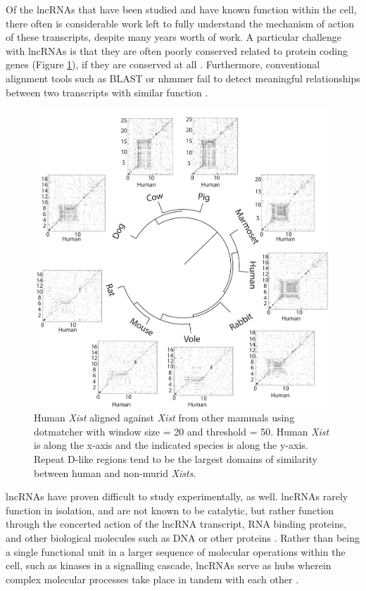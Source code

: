Of the lncRNAs that have been studied and have known function within the cell, there often is considerable work left to fully understand the mechanism of action of these transcripts, despite many years worth of work. A particular challenge with lncRNAs is that they are often poorly conserved related to protein coding genes (Figure \ref{fig:xistconserve}), if they are conserved at all \cite{Sleutels2002TheGenes,Pang2006RapidFunction, Johnsson2014EvolutionaryFunction}. Furthermore, conventional alignment tools such as BLAST or nhmmer fail to detect meaningful relationships between two transcripts with similar function \cite{Kirk2018FunctionalContent,Sprague2019NonlinearDomains}. 

 \begin{figure}[t!]
\centering
\includegraphics[width=.95\textwidth]{images/combined.pdf}
\caption[Much of \emph{Xist} is poorly conserved across species.]{Human \textit{Xist} aligned against \textit{Xist} from other mammals using dotmatcher with window size = 20 and threshold = 50. Human \textit{Xist} is along the x-axis and the indicated species is along the y-axis. Repeat D-like regions tend to be the largest domains of similarity between human and non-murid \textit{Xists}.}
\label{fig:xistconserve}
\end{figure}

lncRNAs have proven difficult to study experimentally, as well. lncRNAs rarely function in isolation, and are not known to be catalytic, but rather function through the concerted action of the lncRNA transcript, RNA binding proteins, and other biological molecules such as DNA or other proteins \cite{Chu2015SystematicProteins,Schertzer2019LncRNA-InducedDNA,Hacisuleyman2016FunctionLocus,Wang2011AExpression,Yang2013MALAT-1Regulation}. Rather than being a single functional unit in a larger sequence of molecular operations within the cell, such as kinases in a signalling cascade, lncRNAs serve as hubs wherein complex molecular processes take place in tandem with each other \cite{Schertzer2019LncRNA-InducedDNA, Chu2015SystematicProteins, Moindrot2015ASilencing,Brockdorff2018LocalNcRNA}. 

